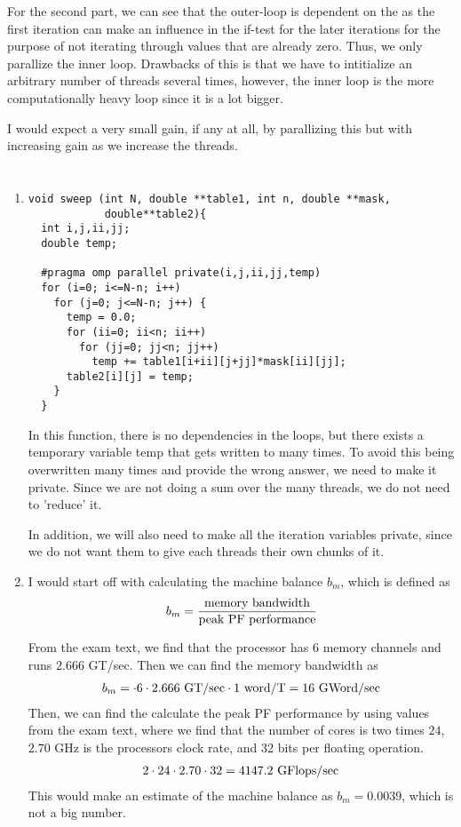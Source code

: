 \documentclass{article}
\begin{document}
For the second part, we can see that the outer-loop is dependent on the as the first iteration can make an influence in the if-test for the later iterations for the purpose of not iterating through values that are already zero. Thus, we only parallize the inner loop. Drawbacks of this is that we have to intitialize an arbitrary number of threads several times, however, the inner loop is the more computationally heavy loop since it is a lot bigger.

I would expect a very small gain, if any at all, by parallizing this but with increasing gain as we increase the threads.


\section{}
\begin{enumerate}[label=(\alph*)]
\item
\begin{lstlisting}
void sweep (int N, double **table1, int n, double **mask,
            double**table2){
  int i,j,ii,jj;
  double temp;

  #pragma omp parallel private(i,j,ii,jj,temp)
  for (i=0; i<=N-n; i++)
    for (j=0; j<=N-n; j++) {
      temp = 0.0;
      for (ii=0; ii<n; ii++)
        for (jj=0; jj<n; jj++)
          temp += table1[i+ii][j+jj]*mask[ii][jj];
      table2[i][j] = temp;
    }
  }
\end{lstlisting}
In this function, there is no dependencies in the loops, but there exists a temporary variable temp that gets written to many times. To avoid this being overwritten many times and provide the wrong answer, we need to make it private. Since we are not doing a sum over the many threads, we do not need to 'reduce' it.

In addition, we will also need to make all the iteration variables private, since we do not want them to give each threads their own chunks of it.

\item

I would start off with calculating the machine balance $b_m$, which is defined as
\begin{align*}
  b_m = \frac{\textnormal{memory bandwidth}}{\textnormal{peak PF performance}}
\end{align*}

From the exam text, we find that the processor has 6 memory channels and runs $2.666$ GT/sec. Then we can find the memory bandwidth as
\begin{align*}
b_m = \cdot 6 \cdot 2.666 \textnormal{ GT/sec} \cdot 1 \textnormal{ word/T} = 16 \textnormal{ GWord/sec}
\end{align*}
Then, we can find the calculate the peak PF performance by using values from the exam text, where we find that the number of cores is two times $24$,  $2.70$ GHz is the processors clock rate, and 32 bits per floating operation.
\begin{align*}
  2\cdot24\cdot2.70\cdot 32 = 4147.2 \textnormal{ GFlops/sec}
\end{align*}
This would make an estimate of the machine balance as
$b_m=0.0039$, which is not a big number.


\end{enumerate}
\end{document}
